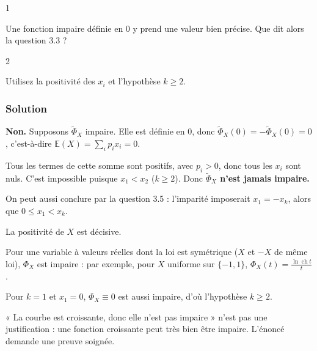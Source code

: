 \documentclass[11pt,a4paper]{article}
\begin{document}
\begin{indication}{1}

Une fonction impaire définie en \(0\) y prend une valeur bien précise. Que dit alors la question 3.3 ?

\end{indication}

\begin{indication}{2}

Utilisez la positivité des \(x_i\) et l'hypothèse \(k\ge 2\).

\end{indication}

\hypertarget{solution-35}{%
\subsubsection{Solution}\label{solution-35}}

\textbf{Non.} Supposons \(\widetilde\Phi_X\) impaire. Elle est définie en \(0\), donc \(\widetilde\Phi_X(0)=-\widetilde\Phi_X(0)=0\), c'est-à-dire \(\mathbb E(X)=\sum_ip_ix_i=0\).

Tous les termes de cette somme sont positifs, avec \(p_i>0\), donc tous les \(x_i\) sont nuls. C'est impossible puisque \(x_1<x_2\) (\(k\ge 2\)). Donc \textbf{\(\widetilde\Phi_X\) n'est jamais impaire.}

On peut aussi conclure par la question 3.5 : l'imparité imposerait \(x_1=-x_k\), alors que \(0\le x_1<x_k\).

\begin{methode}

La positivité de \(X\) est décisive.

Pour une variable à valeurs réelles dont la loi est symétrique (\(X\) et \(-X\) de même loi), \(\Phi_X\) est impaire : par exemple, pour \(X\) uniforme sur \(\{-1,1\}\), \(\Phi_X(t)=\frac{\ln\operatorname{ch}t}{t}\).

Pour \(k=1\) et \(x_1=0\), \(\Phi_X\equiv 0\) est aussi impaire, d'où l'hypothèse \(k\ge 2\).

\end{methode}

\begin{piege}

« La courbe est croissante, donc elle n'est pas impaire » n'est pas une justification : une fonction croissante peut très bien être impaire. L'énoncé demande une preuve soignée.

\end{piege}
\end{document}
